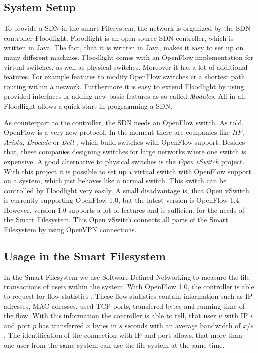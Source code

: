 \subsection{System Setup}
To provide a SDN in the smart Filesystem, the network is organized by the SDN controller Floodlight\cite{flood}. Floodlight is an open source SDN controller, which is written in Java. The fact, that it is written in Java, makes it easy to set up on many different machines. Floodlight comes with an OpenFlow implementation for virtual switches, as well as physical switches. Moreover it has a lot of additional features. For example features to modify OpenFlow switches or a shortest path routing within a network. Furthermore it is easy to extend Floodlight by using provided interfaces or adding new basic features as so called \textit{Modules}. All in all Floodlight allows a quick start in programming a SDN.

As counterpart to the controller, the SDN needs an OpenFlow switch. As told, OpenFlow is a very new protocol. In the moment there are companies like \textit{HP}, \textit{Arista}, \textit{Brocade} or \textit{Dell} , which build switches with OpenFlow support. Besides that, these companies designing switches for large networks where one switch is expensive. A good alternative to physical switches is the \textit{Open vSwitch} project\cite{ovs2}. With this project it is possible to set up a virtual switch with OpenFlow support on a system, which just behaves like a normal switch. This switch can be controlled by Floodlight very easily. A small disadvantage is, that Open vSwitch is currently supporting OpenFlow 1.0\cite{ovs}, but the latest version is OpenFlow 1.4\cite{ofspec4}. However, version 1.0 supports a lot of features and is sufficient for the needs of the Smart Filesystem.
This Open vSwitch connects all parts of the Smart Filesystem by using OpenVPN connections.     
   
\subsection{Usage in the Smart Filesystem}\label{usage}
In the Smart Filesystem we use Software Defined Networking to measure the file transactions of users within the system. With OpenFlow 1.0, the controller is able to request for flow statistics \cite[P. 31]{ofspec}. These flow statistics contain information such as IP adresses, MAC adresses, used TCP ports, transfered bytes and running time of the flow. With this information the controller is able to tell, that user $u$ with IP $i$ and port $p$ has transferred $x$ bytes in $s$ seconds with an average bandwidth of $x/s$. The identification of the connection with IP and port allows, that more than one user from the same system can use the file system at the same time.

